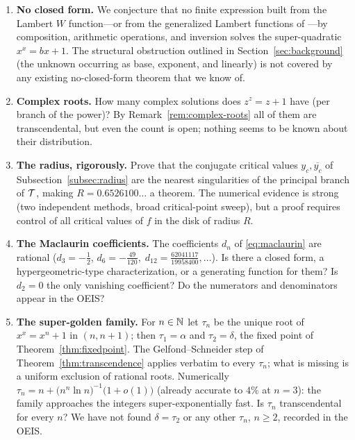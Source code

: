 \begin{enumerate}[label=\textup{(\arabic*)}, leftmargin=2.2em]

\item\label{op:closedform} \textbf{No closed form.} We conjecture that
no finite expression built from the Lambert $W$ function---or from the
generalized Lambert functions of \cite{mezobaricz}---by composition,
arithmetic operations, and inversion solves the super-quadratic
$x^{x} = bx + 1$. The structural obstruction outlined in
Section~\ref{sec:background} (the unknown occurring as base, exponent,
and linearly) is not covered by any existing no-closed-form theorem
that we know of.

\item\label{op:complex-roots} \textbf{Complex roots.} How many complex
solutions does $z^{z} = z + 1$ have (per branch of the power)? By
Remark~\ref{rem:complex-roots} all of them are transcendental, but
even the count is open; nothing seems to be known about their
distribution.

\item\label{op:radius} \textbf{The radius, rigorously.} Prove that the
conjugate critical values $y_{c}, \overline{y_{c}}$ of
Subsection~\ref{subsec:radius} are the nearest singularities of the
principal branch of $\mathcal{T}$, making $R = 0.6526100\ldots$ a theorem.
The numerical evidence is strong (two independent methods, broad
critical-point sweep), but a proof requires control of all critical
values of $f$ in the disk of radius $R$.

\item\label{op:series} \textbf{The Maclaurin coefficients.} The
coefficients $d_{n}$ of \eqref{eq:maclaurin} are rational
($d_{3} = -\tfrac12$, $d_{6} = -\tfrac{49}{120},
\; d_{12} = \tfrac{62041117}{19958400}, \ldots$). Is there a closed
form, a hypergeometric-type characterization, or a generating function
for them? Is $d_{2} = 0$ the only vanishing coefficient? Do the
numerators and denominators appear in the OEIS?

\item\label{op:family} \textbf{The super-golden family.} For
$n \in \mathbb{N}$ let $\tau_{n}$ be the unique root of $x^{x} = x^{n} + 1$ in
$(n, n+1)$; then $\tau_{1} = \alpha$ and $\tau_{2} = \delta$, the
fixed point of Theorem~\ref{thm:fixedpoint}. The Gelfond--Schneider
step of Theorem~\ref{thm:transcendence} applies verbatim to every
$\tau_n$; what is missing is a uniform exclusion of rational roots.
Numerically $\tau_{n} = n + \bigl(n^{n}\ln n\bigr)^{-1}
\bigl(1 + o(1)\bigr)$ (already accurate to $4\%$ at $n = 3$): the
family approaches the integers super-exponentially fast. Is
$\tau_{n}$ transcendental for every $n$? We have not found
$\delta = \tau_{2}$ or any other $\tau_{n}$, $n \ge 2$, recorded in
the OEIS.


\end{enumerate}
